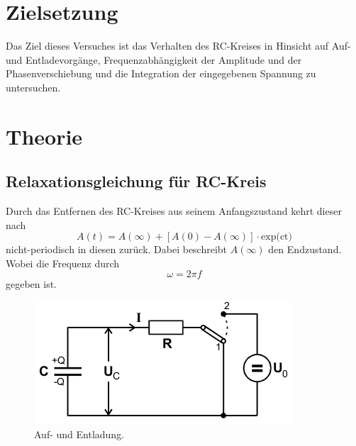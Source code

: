 \section{Zielsetzung}
Das Ziel dieses Versuches ist das Verhalten des RC-Kreises in Hinsicht auf
Auf- und Entladevorgänge, Frequenzabhängigkeit der Amplitude und der Phasenverschiebung
und die Integration der eingegebenen Spannung zu untersuchen.


\section{Theorie}
\subsection{Relaxationsgleichung für RC-Kreis}
Durch das Entfernen des RC-Kreises aus seinem Anfangszustand kehrt
dieser nach
\begin{equation}
  A(t) = A(\infty) + [A(0)- A(\infty)]\cdot \text{exp(ct)}
  \label{eqn:1}
\end{equation}
nicht-periodisch in diesen zurück. Dabei beschreibt $A(\infty)$ den Endzustand.
Wobei die Frequenz durch
\begin{equation}
  \omega = 2\pi f
  \label{eqn:frequenz}
\end{equation}
gegeben ist.

\begin{figure}[H]
  \centering
  \includegraphics{content/images/pic1.png}
  \caption{Auf- und Entladung.}
  \label{pic:1}
\end{figure}


